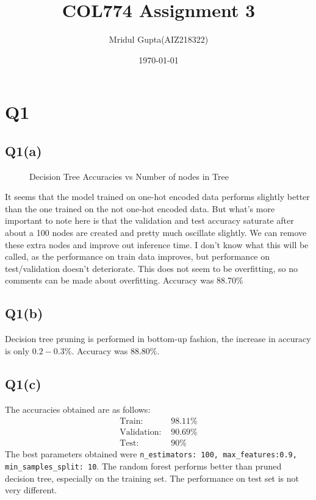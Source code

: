 \documentclass[11pt]{article}
\author{Mridul Gupta(AIZ218322)}
\date{\today}
\title{COL774 Assignment 3}
\begin{document}
\maketitle
\section{Q1}
\label{sec-1}
\subsection{Q1(a)}
\label{sec-1-1}
\begin{figure}[!ht]
	\caption{Decision Tree Accuracies vs Number of nodes in Tree}
\end{figure}
It seems that the model trained on one-hot encoded data performs
slightly better than the one trained on the not one-hot encoded
data. But what's more important to note here is that the validation
and test accuracy saturate after about a 100 nodes are created and
pretty much oscillate slightly. We can remove these extra nodes and
improve out inference time. I don't know what this will be called, as
the performance on train data improves, but performance on
test/validation doesn't deteriorate. This does not seem to be
overfitting, so no comments can be made about overfitting. Accuracy
was 88.70\(\%\)

\subsection{Q1(b)}
\label{sec-1-2}
Decision tree pruning is performed in bottom-up fashion, the increase
in accuracy is only \(0.2-0.3\%\). Accuracy was \(88.80\%\).
\subsection{Q1(c)}
\label{sec-1-3}
The accuracies obtained are as follows:
\begin{align*}
\text{Train: }&98.11\%\\
\text{Validation: }&90.69\%\\
\text{Test: }&90\%
\end{align*}
The best parameters obtained were \texttt{n\_estimators: 100,
max\_features:0.9, min\_samples\_split: 10}. The random forest
performs better than pruned decision tree, especially on the training
set. The performance on test set is not very different.
\end{document}
